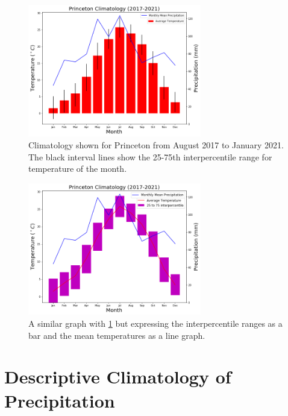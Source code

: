 \documentclass[11pt]{report}
\begin{document}
\clearpage
\begin{figure}[t]
	\centering
	\includegraphics[width=0.675\textwidth]{Figures/Climate1.png}
	\caption[Climatology of temperature and precipitation of Princeton (2017- 2021)]{\label{Clim1} Climatology shown for Princeton from August 2017 to January 2021. The black interval lines show the 25-75th interpercentile range for temperature of the month. }
\end{figure}
\begin{figure}[b]
	\centering
	\includegraphics[width=0.675\textwidth]{Figures/Climate2.png}
	\caption[Climatology of temperature and precipitation of Princeton (2017- 2021) version 2]{\label{Clim2}
	A similar graph with \ref{Clim1} but expressing the interpercentile ranges as a bar and the mean temperatures as a line graph.}
\end{figure}

\clearpage

\clearpage

\section{Descriptive Climatology of Precipitation}\label{sec:dcp}
\end{document}
